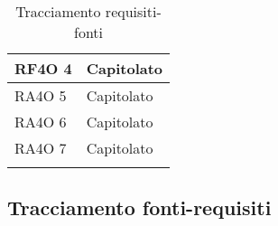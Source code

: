 \begin{center}
\begin{longtable}{ | p{5cm} | p{5cm} |}
        RF4O 4 &  Capitolato \newline  \\ \hline      
        RA4O 5 &  Capitolato \newline  \\ \hline      
        RA4O 6 &  Capitolato \newline  \\ \hline      
        RA4O 7 &  Capitolato \newline  \\ \hline  
      \caption{Tracciamento requisiti-fonti}    
      \end{longtable}
      \egroup
      \end{center}  
\clearpage

\subsection{Tracciamento fonti-requisiti}
